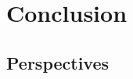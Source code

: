 
\chapter{Conclusion} 	%
\label{Chapter6} 		%


\lipsum[1]


\section{Perspectives}
\label{sec:Ch6.1}

\lipsum[1] 

